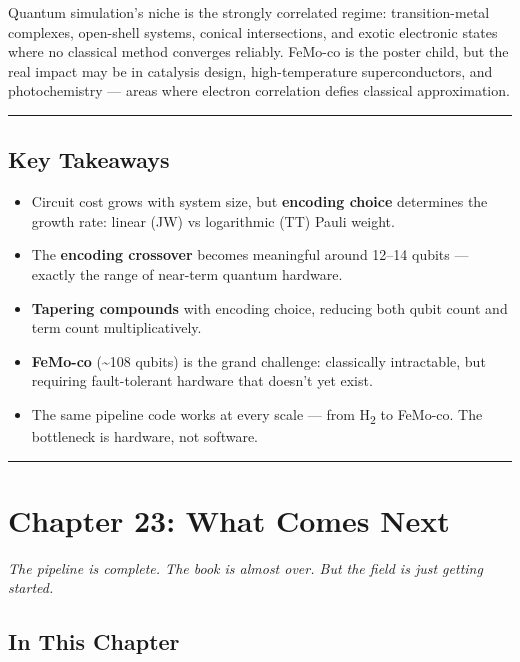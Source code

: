\documentclass[
  11pt,
  oneside]{book}
\providecommand{\tightlist}{%
  \setlength{\itemsep}{0pt}\setlength{\parskip}{0pt}}
\begin{document}
Quantum simulation's niche is the strongly correlated regime:
transition-metal complexes, open-shell systems, conical intersections,
and exotic electronic states where no classical method converges
reliably. FeMo-co is the poster child, but the real impact may be in
catalysis design, high-temperature superconductors, and photochemistry
--- areas where electron correlation defies classical approximation.

\begin{center}\rule{0.5\linewidth}{0.5pt}\end{center}

\section{Key Takeaways}\label{key-takeaways-21}

\begin{itemize}
\tightlist
\item
  Circuit cost grows with system size, but \textbf{encoding choice}
  determines the growth rate: linear (JW) vs logarithmic (TT) Pauli
  weight.
\item
  The \textbf{encoding crossover} becomes meaningful around 12--14
  qubits --- exactly the range of near-term quantum hardware.
\item
  \textbf{Tapering compounds} with encoding choice, reducing both qubit
  count and term count multiplicatively.
\item
  \textbf{FeMo-co} (\textasciitilde108 qubits) is the grand challenge:
  classically intractable, but requiring fault-tolerant hardware that
  doesn't yet exist.
\item
  The same pipeline code works at every scale --- from H\textsubscript{2} to FeMo-co.
  The bottleneck is hardware, not software.
\end{itemize}

\begin{center}\rule{0.5\linewidth}{0.5pt}\end{center}

\chapter{Chapter 23: What Comes Next}\label{chapter-23-what-comes-next}

\emph{The pipeline is complete. The book is almost over. But the field
is just getting started.}

\section{In This Chapter}\label{in-this-chapter-22}
\end{document}
